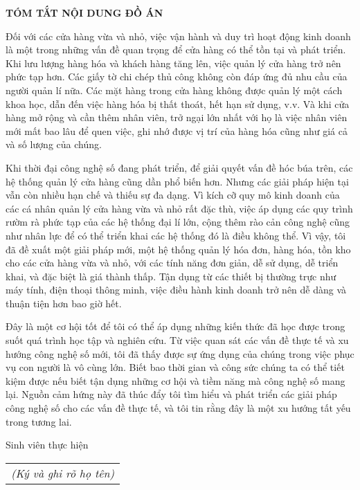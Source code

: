 \documentclass[../DoAn.tex]{subfiles}
\begin{document}
\begin{center}
    \Large{\textbf{TÓM TẮT NỘI DUNG ĐỒ ÁN}}\\
\end{center}
\vspace{1cm}
Đối với các cửa hàng vừa và nhỏ, việc vận hành và duy trì hoạt động kinh doanh là một trong những vấn đề quan trọng để cửa hàng có thể tồn tại và phát triển. Khi lưu lượng hàng hóa và khách hàng tăng lên, việc quản lý cửa hàng trở nên phức tạp hơn. Các giấy tờ chi chép thủ công không còn đáp ứng đủ nhu cầu của người quản lí nữa. Các mặt hàng trong cửa hàng không được quản lý một cách khoa học, dẫn đến việc hàng hóa bị thất thoát, hết hạn sử dụng, v.v. Và khi cửa hàng mở rộng và cần thêm nhân viên, trở ngại lớn nhất với họ là việc nhân viên mới mất bao lâu để quen việc, ghi nhớ được vị trí của hàng hóa cũng như giá cả và số lượng của chúng.

Khi thời đại công nghệ số đang phát triển, để giải quyết vấn đề hóc búa trên, các hệ thống quản lý cửa hàng cũng dần phổ biến hơn. Nhưng các giải pháp hiện tại vẫn còn nhiều hạn chế và thiếu sự đa dạng. Vì kích cỡ quy mô kinh doanh của các cá nhân quản lý cửa hàng vừa và nhỏ rất đặc thù, việc áp dụng các quy trình rườm rà phức tạp của các hệ thống đại lí lớn, cộng thêm rào cản công nghệ cũng như nhân lực để có thể triển khai các hệ thống đó là điều không thể. Vì vậy, tôi đã đề xuất một giải pháp mới, một hệ thống quản lý hóa đơn, hàng hóa, tồn kho cho các cửa hàng vừa và nhỏ, với các tính năng đơn giản, dễ sử dụng, dễ triển khai, và đặc biệt là giá thành thấp. Tận dụng từ các thiết bị thường trực như máy tính, điện thoại thông minh, việc điều hành kinh doanh trở nên dễ dàng và thuận tiện hơn bao giờ hết.

Đây là một cơ hội tốt để tôi có thể áp dụng những kiến thức đã học được trong suốt quá trình học tập và nghiên cứu. Từ việc quan sát các vấn đề thực tế và xu hướng công nghệ số mới, tôi đã thấy được sự ứng dụng của chúng trong việc phục vụ con người là vô cùng lớn. Biết bao thời gian và công sức chúng ta có thể tiết kiệm được nếu biết tận dụng những cơ hội và tiềm năng mà công nghệ số mang lại. Nguồn cảm hứng này đã thúc đẩy tôi tìm hiểu và phát triển các giải pháp công nghệ số cho các vấn đề thực tế, và tôi tin rằng đây là một xu hướng tất yếu trong tương lai.

\begin{flushright}
    Sinh viên thực hiện\\
    \begin{tabular}{@{}c@{}}
        \textit{(Ký và ghi rõ họ tên)}
    \end{tabular}
\end{flushright}
\end{document}
